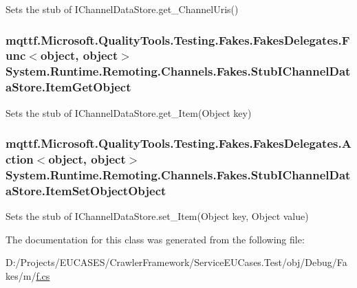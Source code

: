 Sets the stub of I\-Channel\-Data\-Store.\-get\-\_\-\-Channel\-Uris()

\hypertarget{class_system_1_1_runtime_1_1_remoting_1_1_channels_1_1_fakes_1_1_stub_i_channel_data_store_a15716604b0bcd1ed5cd0a69063e0dcff}{
\subsubsection[{Item\-Get\-Object}]{\setlength{\rightskip}{0pt plus 5cm}mqttf.\-Microsoft.\-Quality\-Tools.\-Testing.\-Fakes.\-Fakes\-Delegates.\-Func$<$object, object$>$ System.\-Runtime.\-Remoting.\-Channels.\-Fakes.\-Stub\-I\-Channel\-Data\-Store.\-Item\-Get\-Object}}\label{class_system_1_1_runtime_1_1_remoting_1_1_channels_1_1_fakes_1_1_stub_i_channel_data_store_a15716604b0bcd1ed5cd0a69063e0dcff}


Sets the stub of I\-Channel\-Data\-Store.\-get\-\_\-\-Item(\-Object key)

\hypertarget{class_system_1_1_runtime_1_1_remoting_1_1_channels_1_1_fakes_1_1_stub_i_channel_data_store_a1811b40e6dae24addd5c9231aa2097f7}{
\subsubsection[{Item\-Set\-Object\-Object}]{\setlength{\rightskip}{0pt plus 5cm}mqttf.\-Microsoft.\-Quality\-Tools.\-Testing.\-Fakes.\-Fakes\-Delegates.\-Action$<$object, object$>$ System.\-Runtime.\-Remoting.\-Channels.\-Fakes.\-Stub\-I\-Channel\-Data\-Store.\-Item\-Set\-Object\-Object}}\label{class_system_1_1_runtime_1_1_remoting_1_1_channels_1_1_fakes_1_1_stub_i_channel_data_store_a1811b40e6dae24addd5c9231aa2097f7}


Sets the stub of I\-Channel\-Data\-Store.\-set\-\_\-\-Item(\-Object key, Object value)



The documentation for this class was generated from the following file\-:\begin{DoxyCompactItemize}
\item 
D\-:/\-Projects/\-E\-U\-C\-A\-S\-E\-S/\-Crawler\-Framework/\-Service\-E\-U\-Cases.\-Test/obj/\-Debug/\-Fakes/m/\hyperlink{m_2f_8cs}{f.\-cs}\end{DoxyCompactItemize}
